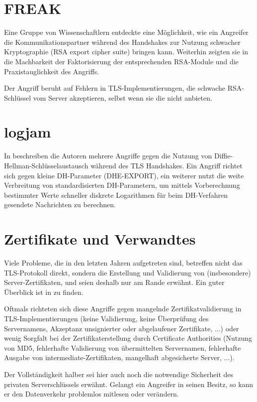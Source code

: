 \section{FREAK}

\label{sec_attack_freak}

Eine Gruppe von Wissenschaftlern entdeckte eine Möglichkeit, wie ein Angreifer die Kommunikationspartner während des Handshakes zur Nutzung schwacher Kryptographie (RSA export cipher suite) bringen kann. Weiterhin zeigten sie in \cite{freak15} die Machbarkeit der Faktorisierung der entsprechenden RSA-Module und die Praxistauglichkeit des Angriffs.

Der Angriff beruht auf Fehlern in TLS-Implementierungen, die schwache RSA-Schlüssel vom Server akzeptieren, selbst wenn sie die \ciphersuites{} nicht anbieten.

\section{logjam}

In \cite{logjam15} beschreiben die Autoren mehrere Angriffe gegen die Nutzung von Diffie-Hellman-Schlüsselaustausch während des TLS Handshakes. Ein Angriff richtet sich gegen kleine DH-Parameter (DHE-EXPORT), ein weiterer nutzt die weite Verbreitung von standardisierten DH-Parametern, um mittels Vorberechnung bestimmter Werte schneller diskrete Logarithmen für beim DH-Verfahren gesendete Nachrichten zu berechnen.

\section{Zertifikate und Verwandtes}

\label{sec_certificates}

Viele Probleme, die in den letzten Jahren aufgetreten sind, betreffen nicht das TLS-Protokoll direkt, sondern die Erstellung und Validierung von (insbesondere) Server-Zertifikaten, und seien deshalb nur am Rande erwähnt. Ein guter Überblick ist in \cite{meyer13} zu finden.

Oftmals richteten sich diese Angriffe gegen mangelnde Zertifikatvalidierung in TLS-Implementierungen (keine Validierung, keine Überprüfung des Servernamens, Akzeptanz unsignierter oder abgelaufener Zertifikate, ...) oder wenig Sorgfalt bei der Zertifikaterstellung durch Certificate Authorities (Nutzung von MD5, fehlerhafte Validierung von übermittelten Servernamen, fehlerhafte Ausgabe von intermediate-Zertifikaten, mangelhaft abgesicherte Server, ...).

Der Vollständigkeit halber sei hier auch noch die notwendige Sicherheit des privaten Serverschlüssels erwähnt. Gelangt ein Angreifer in seinen Besitz, so kann er den Datenverkehr problemlos mitlesen oder verändern.